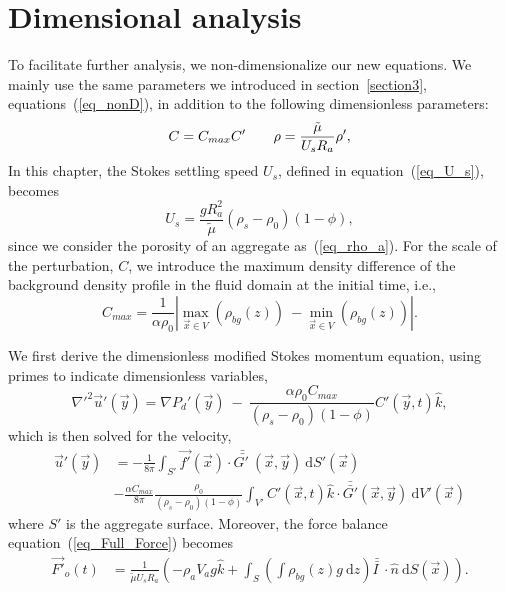 \section{Dimensional analysis}
To facilitate further analysis, we non-dimensionalize our new equations. We mainly use the same parameters we introduced in section~\ref{section3}, equations~(\ref{eq_nonD}), in addition to the following dimensionless parameters:
\begin{equation}
	C= C_{max} C'
\hspace{7mm}
\rho = \frac{\tilde{\mu}  }{{U_s} R_a}  \rho', 
\end{equation}
In this chapter, the Stokes settling speed $U_s$, defined in equation~(\ref{eq_U_s}), becomes
\[
U_s = \frac{g  R_a^2}{\tilde{\mu}}(\rho_s - \rho_0)(1-\phi),
\] 
since we consider the porosity of an aggregate as~(\ref{eq_rho_a}).
For the scale of the perturbation, $C$, we introduce the maximum density difference of the background density profile in the fluid domain at the initial time, i.e., 
\begin{equation}
C_{max} = 
\frac{1}{\alpha \rho_0}
\left|
\max_{\vec{x}\in V} \left(\rho_{bg}(z)  \right)
\ - \min_{\vec{x} \in V} \left(\rho_{bg}(z)  \right) \right|.
\end{equation}
\par
We first derive the dimensionless modified Stokes momentum equation, using primes to indicate dimensionless variables,
\begin{equation}
	{\nabla'}^2  \vec{u}'(\vec{y})
	= \nabla {P_d}'(\vec{y}) \ - \  
	\frac{\alpha \rho_0  C_{max}}{(\rho_s - \rho_0)(1-\phi)}  C'\left(\vec{y},t \right)   \hat{k},
\label{eq_extra_C_nonD}
\end{equation}
which is then solved for the velocity,
 \begin{align}
		\vec{u}'(\vec{y})
			  & =- \frac{1}{8 \pi} \int_{S'}  
			 \vec{f'}(\vec{x}) 
			 \cdot \bar{\bar{G' \ }} (\vec{x},\vec{y}) 
			 \ \textrm{d}S'(\vec{x})
			 \nonumber \\
& -\frac{ \alpha C_{max}}{8\pi } \frac{\rho_0}{(\rho_s - \rho_0)(1-\phi)} 
\int_{V'} C' \left(\vec{x},  t \right) \hat{k} \cdot 
\bar{\bar{G'  }}(\vec{x}, \vec{y} ) 
\ \text{d}V'(\vec{x})
  \label{eq_vel_all_onS_nonD}
 \end{align}
where $S'$ is the aggregate surface. 
Moreover, the force balance equation~(\ref{eq_Full_Force}) becomes
\begin{align}
	 \vec{F'}_o(t)
	 & =
	  \frac{1}{\tilde{\mu} U_s R_a} 
	  \left(
	-   \rho_a V_a g \hat{k}
	  +
	   \int_{S} \left( 
	   \int \rho_{bg}(z) g \ \textrm{d}z 
	   \right) \bar{\bar{I \ }}  \cdot
	  \hat{n} \ \textrm{d}S (\vec{x})
	\right).
\label{eq_Full_Force_nonD}
\end{align}


